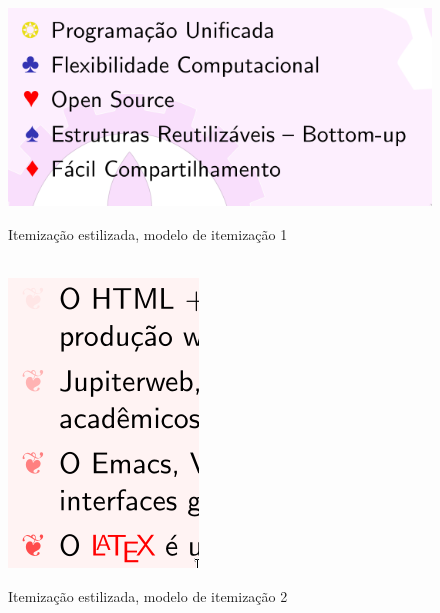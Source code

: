\documentclass[a4paper,11pt]{abntex2}
\theoremstyle{mytheor}
\begin{document}
\begin{figure}[!htb]
  \begin{center}
    \caption{\label{fig:itemizacao} Itemização estilizada, modelo de
      itemização 1}\\

    \includegraphics[scale=0.5]{./imagens/3.png}\\

  \end{center}
\end{figure}

\begin{figure}[!htb]
  \begin{center}
    \caption{\label{fig:itemizacao} Itemização estilizada, modelo de
      itemização 2}\\

    \includegraphics[scale=0.5]{./imagens/4.png}\\

  \end{center}
\end{figure}
\end{document}
